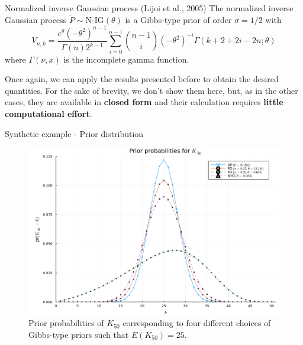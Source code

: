 \documentclass[11pt]{beamer}
\begin{document}
\begin{frame}{Normalized inverse Gaussian process (Lijoi et al., 2005)}
    The normalized inverse Gaussian process \(\tilde{P} \sim \text{N-IG}(\theta)\) is a Gibbs-type prior of order \(\sigma = 1/2\) with
    \begin{equation*}
        V_{n,k} = \frac{e^{\theta}(-\theta^2)^{n-1}}{\Gamma(n)2^{k-1}} \sum_{i=0}^{n-1}\binom{n-1}{i}(-\theta^2)^{-i}\Gamma(k+2+2i-2n; \theta)
    \end{equation*}
    where \(\Gamma(\nu, x)\) is the incomplete gamma function.
    \medskip
    
    Once again, we can apply the results presented before to obtain the desired quantities. For the sake of brevity, we don't show them here, but, as in the other cases, they are available in \textbf{closed form} and their calculation requires \textbf{little computational effort}.
\end{frame}

\begin{frame}{Synthetic example - Prior distribution}
    \begin{figure}
        \includegraphics[scale=0.1]{../img/prior_probability.png}
        \caption{Prior probabilities of \(K_{50}\) corresponding to four different choices of Gibbs-type priors such that \(E(K_{50}) = 25\).}
        \label{fig:prior}
    \end{figure}
\end{frame}
\end{document}

